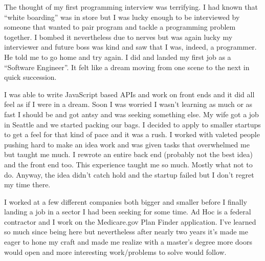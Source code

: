\documentclass{article}
\begin{document}
The thought of my first programming interview was terrifying. I had known that ``white boarding'' was in store but I was lucky enough to be interviewed by someone that wanted to pair program and tackle a programming problem together. I bombed it nevertheless due to nerves but was again lucky my interviewer and future boss was kind and saw that I was, indeed, a programmer. He told me to go home and try again. I did and landed my first job as a ``Software Engineer''. It felt like a dream moving from one scene to the next in quick succession.

I was able to write JavaScript based APIs and work on front ends and it did all feel as if I were in a dream. Soon I was worried I wasn't learning as much or as fast I should be and got antsy and was seeking something else. My wife got a job in Seattle and we started packing our bags. I decided to apply to smaller startups to get a feel for that kind of pace and it was a rush. I worked with valeted people pushing hard to make an idea work and was given tasks that overwhelmed me but taught me much. I rewrote an entire back end (probably not the best idea) and the front end too. This experience taught me so much. Mostly what not to do. Anyway, the idea didn't catch hold and the startup failed but I don't regret my time there. 

I worked at a few different companies both bigger and smaller before I finally landing a job in a sector I had been seeking for some time. Ad Hoc is a federal contractor and I work on the Medicare.gov Plan Finder application. I've learned so much since being here but nevertheless after nearly two years it's made me eager to hone my craft and made me realize with a master's degree more doors would open and more interesting work/problems to solve would follow.
\end{document}
